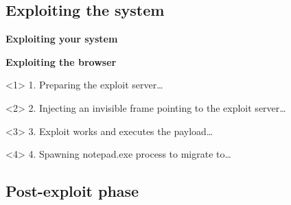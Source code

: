 \subsection{Exploiting the system}

\begin{frame}[plain]
    \begin{center}
      \Huge\bfseries
      Exploiting your system
    \end{center}
\end{frame}

\begin{frame}[plain]
  \begin{center}
    \LARGE\bfseries
    Exploiting the browser
  \end{center}

  \vspace{.5cm}

  \begin{onlyenv}<1>
    1. Preparing the exploit server\ldots
    \begin{center}
    \end{center}
  \end{onlyenv}

  \begin{onlyenv}<2>
    2. Injecting an invisible frame pointing to the exploit server\ldots
    \begin{center}
    \end{center}
  \end{onlyenv}

  \begin{onlyenv}<3>
    3. Exploit works and executes the payload\ldots
    \begin{center}
    \end{center}
  \end{onlyenv}

  \begin{onlyenv}<4>
    4. Spawning notepad.exe process to migrate to\ldots
    \begin{center}
    \end{center}
  \end{onlyenv}

\end{frame}

\subsection{Post-exploit phase}

